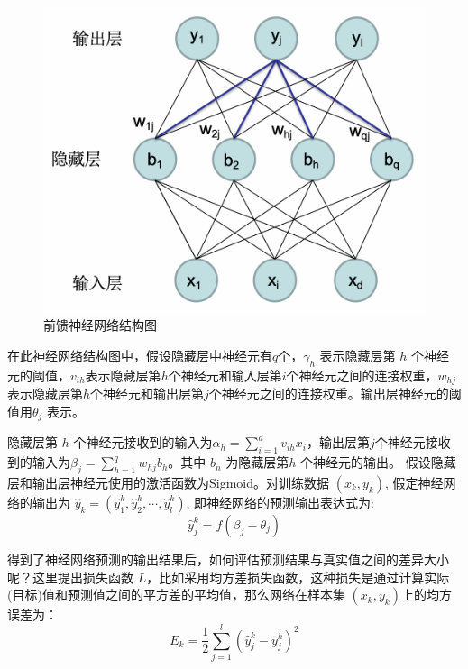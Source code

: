 \begin{figure}[!hbt]
\centering
	\includegraphics[scale=0.5]{fig2/C2/前馈神经网络}%
	\caption{前馈神经网络结构图}
	\label{fig:前馈神经网络结构图}	
\end{figure}

在此神经网络结构图中，假设隐藏层中神经元有$q$个，$\gamma_{h}$ 表示隐藏层第 $h$ 个神经元的阈值，$v_{i h}$表示隐藏层第$h$个神经元和输入层第$i$个神经元之间的连接权重，$w_{h j}$ 表示隐藏层第$h$个神经元和输出层第$j$个神经元之间的连接权重。输出层神经元的阈值用$\theta_{j}$ 表示。

隐藏层第 $h$ 个神经元接收到的输入为$\alpha_{h}=\sum_{i=1}^{d} v_{i h} x_{i}$，输出层第$j$个神经元接收到的输入为$\beta_{j}=\sum_{h=1}^{q} w_{h j} b_{h}$。其中 $b_{n}$ 为隐藏层第$h$ 个神经元的输出。
假设隐藏层和输出层神经元使用的激活函数为Sigmoid。对训练数据 $\left(x_{k}, y_{k}\right)$, 假定神经网络的输出为 $\hat{y}_{k}=\left(\hat{y}_{1}^{k}, \hat{y}_{2}^{k}, \cdots, \hat{y}_{l}^{k}\right)$, 即神经网络的预测输出表达式为:
\begin{equation}\label{神经网络预测输出}
\hat{y}_{j}^{k}=f\left(\beta_{j}-\theta_{j}\right)
\end{equation}

得到了神经网络预测的输出结果后，如何评估预测结果与真实值之间的差异大小呢？这里提出损失函数 $L$，比如采用均方差损失函数，这种损失是通过计算实际(目标)值和预测值之间的平方差的平均值，那么网络在样本集 $\left(x_{k}, y_{k}\right)$上的均方误差为：
\begin{equation}\label{神经网络损失函数}
E_{k}=\frac{1}{2} \sum_{j=1}^{l}\left(\hat{y}_{j}^{k}-y_{j}^{k}\right)^{2}
\end{equation}

